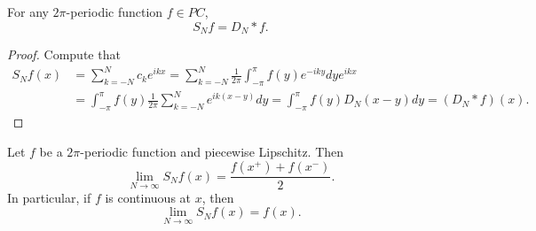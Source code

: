 \begin{proposition}
    For any $2\pi$-periodic function $f\in PC$,
    \begin{equation*}
        S_Nf = D_N*f.
    \end{equation*}
\end{proposition}
\begin{proof}
    Compute that 
    \begin{equation*}
        \begin{split}
            S_Nf(x) &= \sum_{k=-N}^N c_k e^{ikx} = \sum_{k=-N}^N \frac{1}{2\pi} \int_{-\pi}^\pi f(y)e^{-iky}dy e^{ikx} \\
            &= \int_{-\pi}^\pi f(y) \frac{1}{2\pi}\sum_{k=-N}^N e^{ik(x-y)}dy = \int_{-\pi}^\pi f(y)D_N(x-y)dy = (D_N*f)(x).
        \end{split}
    \end{equation*}
\end{proof}

\begin{theorem}
    Let $f$ be a $2\pi$-periodic function and piecewise Lipschitz. Then 
    \begin{equation*}
        \lim_{N\to\infty} S_Nf(x) = \frac{f(x^+)+f(x^-)}{2}.
    \end{equation*}
    In particular, if $f$ is continuous at $x$, then 
    \begin{equation*}
        \lim_{N\to\infty} S_Nf(x) = f(x).
    \end{equation*}
\end{theorem}